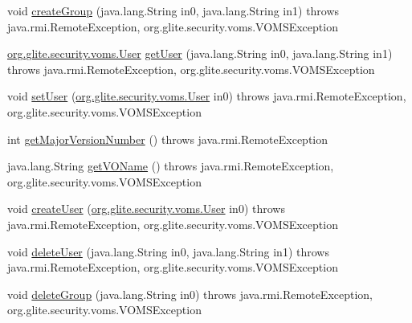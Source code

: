 \begin{DoxyCompactItemize}
\item 
void \hyperlink{classorg_1_1glite_1_1security_1_1voms_1_1service_1_1admin_1_1VOMSAdminSoapBindingImpl_a2c91c6defbb09fd091e2ce2f29cd2511}{createGroup} (java.lang.String in0, java.lang.String in1)  throws java.rmi.RemoteException, org.glite.security.voms.VOMSException 
\item 
\hyperlink{classorg_1_1glite_1_1security_1_1voms_1_1User}{org.glite.security.voms.User} \hyperlink{classorg_1_1glite_1_1security_1_1voms_1_1service_1_1admin_1_1VOMSAdminSoapBindingImpl_a68808255d105dff14f74f13d1095b27b}{getUser} (java.lang.String in0, java.lang.String in1)  throws java.rmi.RemoteException, org.glite.security.voms.VOMSException 
\item 
void \hyperlink{classorg_1_1glite_1_1security_1_1voms_1_1service_1_1admin_1_1VOMSAdminSoapBindingImpl_ae2169346cd25a45e4090ddb4e4871490}{setUser} (\hyperlink{classorg_1_1glite_1_1security_1_1voms_1_1User}{org.glite.security.voms.User} in0)  throws java.rmi.RemoteException, org.glite.security.voms.VOMSException 
\item 
int \hyperlink{classorg_1_1glite_1_1security_1_1voms_1_1service_1_1admin_1_1VOMSAdminSoapBindingImpl_a4edc3a4efb665a96ce36121018d1d9b2}{getMajorVersionNumber} ()  throws java.rmi.RemoteException 
\item 
java.lang.String \hyperlink{classorg_1_1glite_1_1security_1_1voms_1_1service_1_1admin_1_1VOMSAdminSoapBindingImpl_abcf600eaa6bb54382254727bd6152ac8}{getVOName} ()  throws java.rmi.RemoteException, org.glite.security.voms.VOMSException 
\item 
void \hyperlink{classorg_1_1glite_1_1security_1_1voms_1_1service_1_1admin_1_1VOMSAdminSoapBindingImpl_ac803e9fe4e2f3da52ee506e136a81a82}{createUser} (\hyperlink{classorg_1_1glite_1_1security_1_1voms_1_1User}{org.glite.security.voms.User} in0)  throws java.rmi.RemoteException, org.glite.security.voms.VOMSException 
\item 
void \hyperlink{classorg_1_1glite_1_1security_1_1voms_1_1service_1_1admin_1_1VOMSAdminSoapBindingImpl_aecfa84483640262bbf0b8a2e59fc9193}{deleteUser} (java.lang.String in0, java.lang.String in1)  throws java.rmi.RemoteException, org.glite.security.voms.VOMSException 
\item 
void \hyperlink{classorg_1_1glite_1_1security_1_1voms_1_1service_1_1admin_1_1VOMSAdminSoapBindingImpl_a5ad125bfc7f25f70eee48dc09a82e8c9}{deleteGroup} (java.lang.String in0)  throws java.rmi.RemoteException, org.glite.security.voms.VOMSException 

\end{DoxyCompactItemize}
